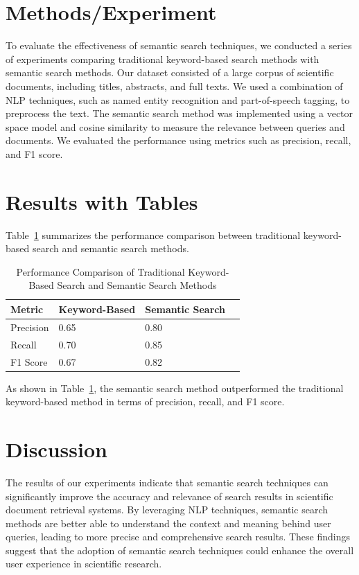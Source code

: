 \documentclass{article}
\begin{document}
\section{Methods/Experiment}
To evaluate the effectiveness of semantic search techniques, we conducted a series of experiments comparing traditional keyword-based search methods with semantic search methods. Our dataset consisted of a large corpus of scientific documents, including titles, abstracts, and full texts. We used a combination of NLP techniques, such as named entity recognition and part-of-speech tagging, to preprocess the text. The semantic search method was implemented using a vector space model and cosine similarity to measure the relevance between queries and documents. We evaluated the performance using metrics such as precision, recall, and F1 score.

\section{Results with Tables}
Table~\ref{tab:results} summarizes the performance comparison between traditional keyword-based search and semantic search methods.

\begin{table}[ht]
\centering
\caption{Performance Comparison of Traditional Keyword-Based Search and Semantic Search Methods}
\label{tab:results}
\begin{tabular}{@{}llll@{}}
\toprule
\textbf{Metric} & \textbf{Keyword-Based} & \textbf{Semantic Search} \\
\midrule
Precision & 0.65 & 0.80 \\
Recall & 0.70 & 0.85 \\
F1 Score & 0.67 & 0.82 \\
\bottomrule
\end{tabular}
\end{table}

As shown in Table~\ref{tab:results}, the semantic search method outperformed the traditional keyword-based method in terms of precision, recall, and F1 score.

\section{Discussion}
The results of our experiments indicate that semantic search techniques can significantly improve the accuracy and relevance of search results in scientific document retrieval systems. By leveraging NLP techniques, semantic search methods are better able to understand the context and meaning behind user queries, leading to more precise and comprehensive search results. These findings suggest that the adoption of semantic search techniques could enhance the overall user experience in scientific research.
\end{document}
